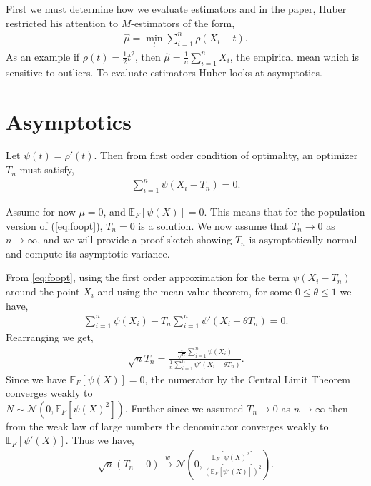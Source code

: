 \documentclass{article}
\newcommand{\Ep}{\ensuremath{\mathbb{E}_F}}
\begin{document}
First we must determine how we evaluate estimators and in the paper, Huber restricted his attention to $M$-estimators of the form,
\begin{align*}
    \hat{\mu} = \min_{t} \sum_{i=1}^n \rho(X_i - t).
\end{align*}
As an example if $\rho(t) = \frac{1}{2} t^2$, then $\hat{\mu} = \frac{1}{n} \sum_{i=1}^n X_i$, the empirical mean which is sensitive to outliers. 
To evaluate estimators Huber looks at asymptotics. 
\section{Asymptotics}
\label{sec:2}
Let $\psi(t) = \rho'(t)$. Then from first order condition of optimality, an optimizer $T_n$ must satisfy,
\begin{align}
    \sum_{i=1}^n \psi(X_i - T_n) = 0. \label{eq:foopt}
\end{align}

Assume for now $\mu = 0$, and $\Ep[\psi(X)] = 0$. This means that for the population version of (\ref{eq:foopt}), $T_n = 0$ is a solution. We now assume that $T_n\to 0$ as $n\to \infty$, and we will provide a proof sketch showing $T_n$ is asymptotically normal and compute its asymptotic variance. 

From \eqref{eq:foopt}, using the first order approximation for the term $\psi(X_i - T_n) $ around the point $X_i$ and using the mean-value theorem, for some $0 \leq \theta \leq 1$ we have,
\begin{align*}
    \sum_{i=1}^n \psi(X_i) - T_n \sum_{i=1}^n \psi'(X_i - \theta T_n) = 0. 
\end{align*}
Rearranging we get,
\begin{align*}
    \sqrt{n} T_n = \frac{\frac{1}{\sqrt{n}} \sum_{i=1}^n \psi(X_i)}{\frac{1}{n}\sum_{i=1}^n \psi'(X_i - \theta T_n)}.
\end{align*}
Since we have $\Ep[\psi(X)] = 0$, the numerator by the Central Limit Theorem converges weakly to \\ \mbox{$N \sim \mathcal{N}(0, \Ep[\psi(X)^2])$}. Further since we assumed $T_n \rightarrow 0$ as $n \rightarrow \infty$ then from the weak law of large numbers the denominator converges weakly to $\Ep[\psi'(X)]$. Thus we have,
\begin{align*}
    \sqrt{n} (T_n -0) \xrightarrow{w} \mathcal{N}\left(0, \frac{\Ep[\psi(X)^2]}{(\Ep[\psi'(X)])^2} \right). 
\end{align*}
\end{document}
